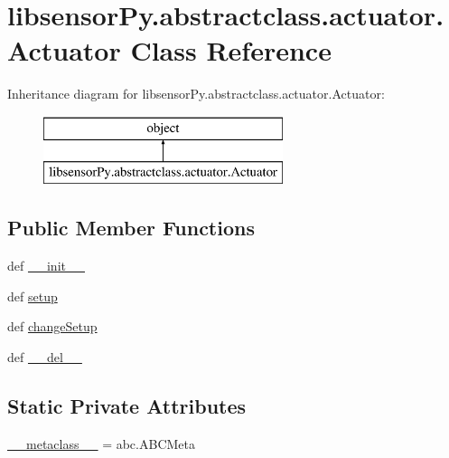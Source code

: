 \hypertarget{classlibsensorPy_1_1abstractclass_1_1actuator_1_1Actuator}{}\section{libsensor\+Py.\+abstractclass.\+actuator.\+Actuator Class Reference}
\label{classlibsensorPy_1_1abstractclass_1_1actuator_1_1Actuator}
Inheritance diagram for libsensor\+Py.\+abstractclass.\+actuator.\+Actuator\+:\begin{figure}[H]
\begin{center}
\leavevmode
\includegraphics[height=2.000000cm]{classlibsensorPy_1_1abstractclass_1_1actuator_1_1Actuator}
\end{center}
\end{figure}
\subsection*{Public Member Functions}
\begin{DoxyCompactItemize}
\item 
def \hyperlink{classlibsensorPy_1_1abstractclass_1_1actuator_1_1Actuator_a0b8bb6d6a480afdf56d545bf21eb9639}{\+\_\+\+\_\+init\+\_\+\+\_\+}
\item 
def \hyperlink{classlibsensorPy_1_1abstractclass_1_1actuator_1_1Actuator_a9f6a2b34ff4c5ebe45197a7465007027}{setup}
\item 
def \hyperlink{classlibsensorPy_1_1abstractclass_1_1actuator_1_1Actuator_af2949fccfea2c4200cb4dd662a746112}{change\+Setup}
\item 
def \hyperlink{classlibsensorPy_1_1abstractclass_1_1actuator_1_1Actuator_a7e9c540f1887d3e9e4d32f1135637973}{\+\_\+\+\_\+del\+\_\+\+\_\+}
\end{DoxyCompactItemize}
\subsection*{Static Private Attributes}
\begin{DoxyCompactItemize}
\item 
\hyperlink{classlibsensorPy_1_1abstractclass_1_1actuator_1_1Actuator_ac248e8fdf90e84dfefbd61f758e55499}{\+\_\+\+\_\+metaclass\+\_\+\+\_\+} = abc.\+A\+B\+C\+Meta
\end{DoxyCompactItemize}


